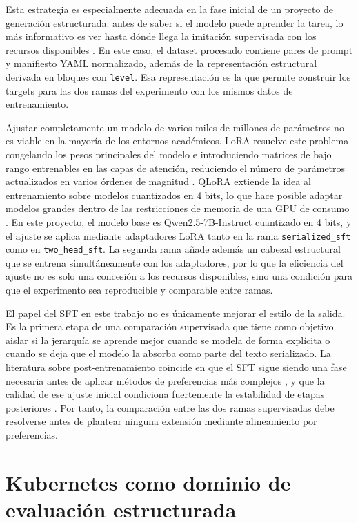 Esta estrategia es especialmente adecuada en la fase inicial de un proyecto de generación estructurada: antes de saber si el modelo puede aprender la tarea, lo más informativo es ver hasta dónde llega la imitación supervisada con los recursos disponibles \citep{wu2025sft}. En este caso, el dataset procesado contiene pares de prompt y manifiesto YAML normalizado, además de la representación estructural derivada en bloques con \texttt{level}. Esa representación es la que permite construir los targets para las dos ramas del experimento con los mismos datos de entrenamiento.

Ajustar completamente un modelo de varios miles de millones de parámetros no es viable en la mayoría de los entornos académicos. LoRA resuelve este problema congelando los pesos principales del modelo e introduciendo matrices de bajo rango entrenables en las capas de atención, reduciendo el número de parámetros actualizados en varios órdenes de magnitud \citep{hu2021lora}. QLoRA extiende la idea al entrenamiento sobre modelos cuantizados en 4 bits, lo que hace posible adaptar modelos grandes dentro de las restricciones de memoria de una GPU de consumo \citep{dettmers2023qlora}. En este proyecto, el modelo base es Qwen2.5-7B-Instruct cuantizado en 4 bits, y el ajuste se aplica mediante adaptadores LoRA tanto en la rama \texttt{serialized\_sft} como en \texttt{two\_head\_sft}. La segunda rama añade además un cabezal estructural que se entrena simultáneamente con los adaptadores, por lo que la eficiencia del ajuste no es solo una concesión a los recursos disponibles, sino una condición para que el experimento sea reproducible y comparable entre ramas.

El papel del SFT en este trabajo no es únicamente mejorar el estilo de la salida. Es la primera etapa de una comparación supervisada que tiene como objetivo aislar si la jerarquía se aprende mejor cuando se modela de forma explícita o cuando se deja que el modelo la absorba como parte del texto serializado. La literatura sobre post-entrenamiento coincide en que el SFT sigue siendo una fase necesaria antes de aplicar métodos de preferencias más complejos \citep{wei2022scaling}, y que la calidad de ese ajuste inicial condiciona fuertemente la estabilidad de etapas posteriores \citep{xu2024dpoPpo}. Por tanto, la comparación entre las dos ramas supervisadas debe resolverse antes de plantear ninguna extensión mediante alineamiento por preferencias.

\section{Kubernetes como dominio de evaluación estructurada}
\label{sec:estado-arte-kubernetes}


